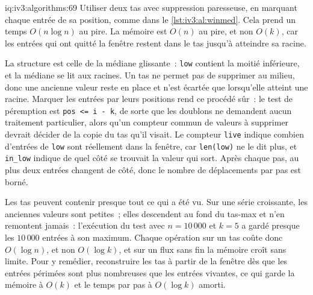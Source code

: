\begin{solution}{iq:iv3:algorithms:69}
Utiliser deux tas avec suppression paresseuse, en marquant chaque entrée de sa position, comme dans le \cref{lst:iv3:al:winmed}. Cela prend un temps $O(n \log n)$ au pire. La mémoire est $O(n)$ au pire, et non $O(k)$, car les entrées qui ont quitté la fenêtre restent dans le tas jusqu'à atteindre sa racine.
\label{lst:iv3:al:winmed}

La structure est celle de la médiane glissante~: \texttt{low} contient la moitié inférieure, et la médiane se lit aux racines. Un tas ne permet pas de supprimer au milieu, donc une ancienne valeur reste en place et n'est écartée que lorsqu'elle atteint une racine. Marquer les entrées par leurs positions rend ce procédé sûr~: le test de péremption est \texttt{pos <= i - k}, de sorte que les doublons ne demandent aucun traitement particulier, alors qu'un compteur commun de valeurs à supprimer devrait décider de la copie du tas qu'il visait. Le compteur \texttt{live} indique combien d'entrées de \texttt{low} sont réellement dans la fenêtre, car \texttt{len(low)} ne le dit plus, et \texttt{in\_low} indique de quel côté se trouvait la valeur qui sort. Après chaque pas, au plus deux entrées changent de côté, donc le nombre de déplacements par pas est borné.

Les tas peuvent contenir presque tout ce qui a été vu. Sur une série croissante, les anciennes valeurs sont petites~; elles descendent au fond du tas-max et n'en remontent jamais~: l'exécution du test avec $n = 10\,000$ et $k = 5$ a gardé presque les $10\,000$ entrées à son maximum. Chaque opération sur un tas coûte donc $O(\log n)$, et non $O(\log k)$, et sur un flux sans fin la mémoire croît sans limite. Pour y remédier, reconstruire les tas à partir de la fenêtre dès que les entrées périmées sont plus nombreuses que les entrées vivantes, ce qui garde la mémoire à $O(k)$ et le temps par pas à $O(\log k)$ amorti.

\end{solution}

